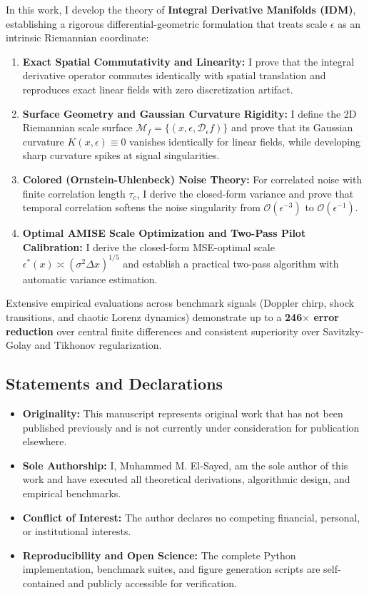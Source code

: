 \documentclass[11pt,a4paper]{article}
\begin{document}
In this work, I develop the theory of \textbf{Integral Derivative Manifolds (IDM)}, establishing a rigorous differential-geometric formulation that treats scale $\epsilon$ as an intrinsic Riemannian coordinate:
\begin{enumerate}
    \item \textbf{Exact Spatial Commutativity and Linearity:} I prove that the integral derivative operator commutes identically with spatial translation and reproduces exact linear fields with zero discretization artifact.
    \item \textbf{Surface Geometry and Gaussian Curvature Rigidity:} I define the 2D Riemannian scale surface $\mathcal{M}_f = \{(x, \epsilon, \mathcal{D}_\epsilon f)\}$ and prove that its Gaussian curvature $K(x, \epsilon) \equiv 0$ vanishes identically for linear fields, while developing sharp curvature spikes at signal singularities.
    \item \textbf{Colored (Ornstein-Uhlenbeck) Noise Theory:} For correlated noise with finite correlation length $\tau_c$, I derive the closed-form variance and prove that temporal correlation softens the noise singularity from $\mathcal{O}(\epsilon^{-3})$ to $\mathcal{O}(\epsilon^{-1})$.
    \item \textbf{Optimal AMISE Scale Optimization and Two-Pass Pilot Calibration:} I derive the closed-form MSE-optimal scale $\epsilon^*(x) \asymp (\sigma^2 \Delta x)^{1/5}$ and establish a practical two-pass algorithm with automatic variance estimation.
\end{enumerate}

Extensive empirical evaluations across benchmark signals (Doppler chirp, shock transitions, and chaotic Lorenz dynamics) demonstrate up to a \textbf{246$\times$ error reduction} over central finite differences and consistent superiority over Savitzky-Golay and Tikhonov regularization.

\subsection*{Statements and Declarations}
\begin{itemize}
    \item \textbf{Originality:} This manuscript represents original work that has not been published previously and is not currently under consideration for publication elsewhere.
    \item \textbf{Sole Authorship:} I, Muhammed M. El-Sayed, am the sole author of this work and have executed all theoretical derivations, algorithmic design, and empirical benchmarks.
    \item \textbf{Conflict of Interest:} The author declares no competing financial, personal, or institutional interests.
    \item \textbf{Reproducibility and Open Science:} The complete Python implementation, benchmark suites, and figure generation scripts are self-contained and publicly accessible for verification.
\end{itemize}
\end{document}
